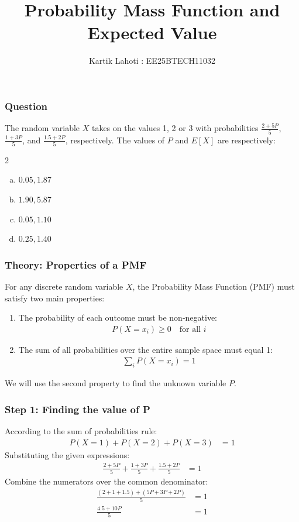 \documentclass{beamer}
\title{Probability Mass Function and Expected Value}
\author{Kartik Lahoti : EE25BTECH11032}
\begin{document}
\begin{frame}
    \titlepage
\end{frame}

\begin{frame}
    \frametitle{Question}
    The random variable $X$ takes on the values 1, 2 or 3 with probabilities $\frac{2+5P}{5}$, $\frac{1+3P}{5}$, and $\frac{1.5+2P}{5}$, respectively. The values of $P$ and $E[X]$ are respectively:
    
    \vspace{0.5cm}
    \begin{multicols}{2}
        \begin{enumerate}[a)]
        \item $0.05, 1.87$
        \item $1.90, 5.87$
        \item $0.05, 1.10$
        \item $0.25, 1.40$
        \end{enumerate}
    \end{multicols}
\end{frame}

\begin{frame}
    \frametitle{Theory: Properties of a PMF}
    For any discrete random variable $X$, the Probability Mass Function (PMF) must satisfy two main properties:
    
    \vspace{0.3cm}
    \begin{enumerate}
        \item The probability of each outcome must be non-negative:
        \begin{align}
            P(X = x_i) \geq 0 \quad \text{for all } i
        \end{align}
        \item The sum of all probabilities over the entire sample space must equal 1:
        \begin{align}
            \sum_{i} P(X = x_i) = 1
        \end{align}
    \end{enumerate}
    
    \vspace{0.3cm}
    We will use the second property to find the unknown variable $P$.
\end{frame}

\begin{frame}
    \frametitle{Step 1: Finding the value of P}
    According to the sum of probabilities rule:
    \begin{align}
        P(X=1) + P(X=2) + P(X=3) &= 1
    \end{align}
    Substituting the given expressions:
    \begin{align}
        \frac{2+5P}{5} + \frac{1+3P}{5} + \frac{1.5+2P}{5} &= 1
    \end{align}
    Combine the numerators over the common denominator:
    \begin{align}
        \frac{(2 + 1 + 1.5) + (5P + 3P + 2P)}{5} &= 1 \\
        \frac{4.5 + 10P}{5} &= 1
    \end{align}
\end{frame}
\end{document}
